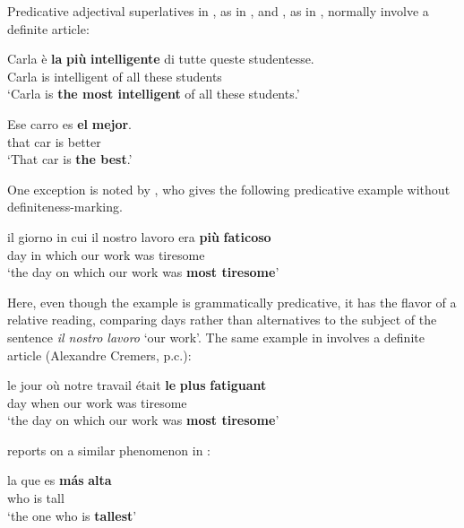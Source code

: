 \documentclass[output=paper
,modfonts
,nonflat]{langsci/langscibook}
\begin{document}
Predicative adjectival superlatives in , as in , and , as in , normally involve a definite article:

\ea \label{ex:coppockstrand:52}
\gll Carla \`e \textbf{la} \textbf{pi\`u} \textbf{intelligente} di tutte queste studentesse.\\
Carla is  \cmpr{} intelligent of all these students\\ 
\glt`Carla is \textbf{the most intelligent} of all these students.' \citep[53]{deBoer1986}
\z

\ea \label{ex:coppockstrand:53}
\gll Ese carro es \textbf{el} \textbf{mejor}.\\
that car is  better\\ 
\glt`That car is \textbf{the best}.' \citep[1]{Rohena-Madrazo2007}
\z

One exception is noted by \citet[53]{deBoer1986}, who gives the following predicative example without definiteness-marking.

\ea \label{ex:coppockstrand:54}
\gll il giorno in cui il nostro lavoro era \textbf{pi\`u} \textbf{faticoso}\\
 day in which  our work was \cmpr{} tiresome\\ 
\glt `the day on which our work was \textbf{most tiresome}'
\z

Here, even though the example is grammatically predicative, it has the flavor of a relative reading, comparing days rather than  alternatives to the subject of the sentence \textit{il nostro lavoro} `our work'. The same example in  involves a definite article (Alexandre Cremers, p.c.):

\ea \label{ex:coppockstrand:55}
\gll le jour où notre travail était \textbf{le} \textbf{plus} \textbf{fatiguant}\\
 day when our work was  \cmpr{} tiresome\\ 
\glt `the day on which our work was \textbf{most tiresome}'
\z

\citet[75]{Matushansky2008} reports on a similar phenomenon in :

\ea \label{ex:coppockstrand:56}
\gll la que es \textbf{m\'as} \textbf{alta}\\
 who is \cmpr{} tall\\ 
\glt`the one who is \textbf{tallest}'
\z
\end{document}
